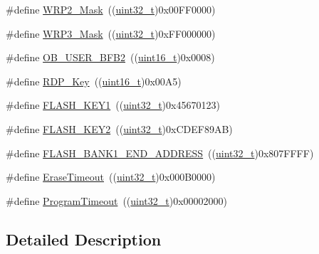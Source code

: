 \begin{DoxyCompactItemize}
\item 
\#define \hyperlink{group___f_l_a_s_h___private___defines_ga4676f67c7be97a09eb1c6a5753ce0523}{W\+R\+P2\+\_\+\+Mask}~((\hyperlink{_p_e___types_8h_a33594304e786b158f3fb30289278f5af}{uint32\+\_\+t})0x00\+F\+F0000)
\item 
\#define \hyperlink{group___f_l_a_s_h___private___defines_ga649ce8b78520ca192b41aabe2daef035}{W\+R\+P3\+\_\+\+Mask}~((\hyperlink{_p_e___types_8h_a33594304e786b158f3fb30289278f5af}{uint32\+\_\+t})0x\+F\+F000000)
\item 
\#define \hyperlink{group___f_l_a_s_h___private___defines_ga5098bd938dadebbbdf9e628c84b2dcf0}{O\+B\+\_\+\+U\+S\+E\+R\+\_\+\+B\+F\+B2}~((\hyperlink{_p_e___types_8h_a1f1825b69244eb3ad2c7165ddc99c956}{uint16\+\_\+t})0x0008)
\item 
\#define \hyperlink{group___f_l_a_s_h___private___defines_ga34ec82060edcc9a18bf804b07dec5881}{R\+D\+P\+\_\+\+Key}~((\hyperlink{_p_e___types_8h_a1f1825b69244eb3ad2c7165ddc99c956}{uint16\+\_\+t})0x00\+A5)
\item 
\#define \hyperlink{group___f_l_a_s_h___private___defines_gafd77e7bf91765d891ce63e2f0084b019}{F\+L\+A\+S\+H\+\_\+\+K\+E\+Y1}~((\hyperlink{_p_e___types_8h_a33594304e786b158f3fb30289278f5af}{uint32\+\_\+t})0x45670123)
\item 
\#define \hyperlink{group___f_l_a_s_h___private___defines_gaee83d0f557e158da52f4a205db6b60a7}{F\+L\+A\+S\+H\+\_\+\+K\+E\+Y2}~((\hyperlink{_p_e___types_8h_a33594304e786b158f3fb30289278f5af}{uint32\+\_\+t})0x\+C\+D\+E\+F89\+A\+B)
\item 
\#define \hyperlink{group___f_l_a_s_h___private___defines_ga54cf78f1be63ba209709bf8f781ccd01}{F\+L\+A\+S\+H\+\_\+\+B\+A\+N\+K1\+\_\+\+E\+N\+D\+\_\+\+A\+D\+D\+R\+E\+SS}~((\hyperlink{_p_e___types_8h_a33594304e786b158f3fb30289278f5af}{uint32\+\_\+t})0x807\+F\+F\+F\+F)
\item 
\#define \hyperlink{group___f_l_a_s_h___private___defines_ga62b5515e9a29a487adcc30a88d082244}{Erase\+Timeout}~((\hyperlink{_p_e___types_8h_a33594304e786b158f3fb30289278f5af}{uint32\+\_\+t})0x000\+B0000)
\item 
\#define \hyperlink{group___f_l_a_s_h___private___defines_ga0794a43966b6084d28d13c651c739385}{Program\+Timeout}~((\hyperlink{_p_e___types_8h_a33594304e786b158f3fb30289278f5af}{uint32\+\_\+t})0x00002000)
\end{DoxyCompactItemize}


\subsection{Detailed Description}


